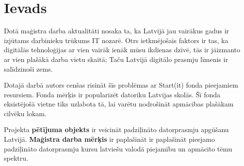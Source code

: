 \chapter*{Ievads} %
Dotā maģistra darba aktualitāti nosaka ta, ka Latvijā jau vairākus gadus ir izjūtams darbinieku 
trūkums IT nozarē. Otrs ietkmējošais faktors ir tas, ka digitālās tehnoloģijas ar vien vairāk
ienāk mūsu ikdienas dzīvē, tās ir jāizmanto ar vien plašākā darba vietu skaitā; Taču Latvijā
digitālo prasmju līmenis ir salīdzinoši zems. 
\par
Dotajā darbā autors cenšas risināt šīs problēmas ar Start(it) fonda pieejamiem resursiem. Fonda mērķis
ir popularizēt datoriku Latvijas skolās. Šī fonda eksistējošā vietne tiks uzlabota tā, lai varētu 
nodrošināt apmācības plašākam cilvēku lokam.
\par
Projekta \textbf{pētījuma objekts} ir veicināt padziļināto datorprasmju apgūšanu Latvijā.
\textbf{Maģistra darba mērķis} ir paplašināt ir paplašināt pieejamo padziļināto datorprasmju kursu latviešu valodā
piejamību un apmācīto tēmu spektru.


